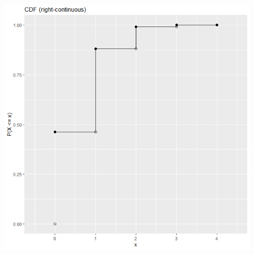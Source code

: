 \documentclass[12pt]{article}
\newenvironment{problem}[2][Problem]{\begin{trivlist}
\item[\hskip \labelsep {\bfseries #1}\hskip \labelsep {\bfseries #2.}]}
{\end{trivlist}}
\begin{document}
\begin{problem}{7}
\begin{itemize}
\begin{center}
      \includegraphics[width=\textwidth]{7cdf.png}
    \end{center}
  \end{itemize}
\end{problem}
\end{document}
